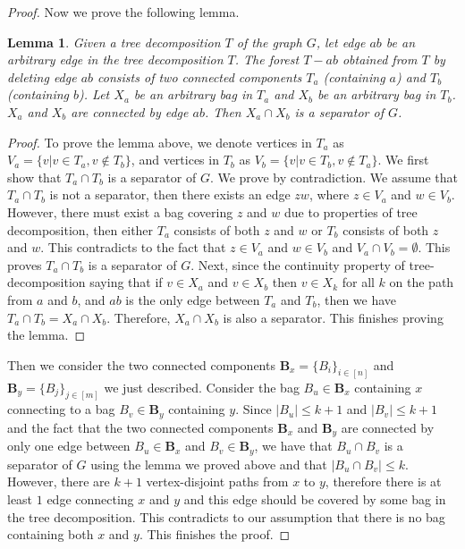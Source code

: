 \documentclass{article}
\newtheorem*{lemma}{Lemma}
\begin{document}
\begin{proof}
Now we prove the following lemma.

\begin{lemma}
Given a tree decomposition \(T\) of the graph \(G\), let edge \(ab\) be an arbitrary edge in the tree decomposition \(T\). The forest \(T-ab\) obtained from \(T\) by deleting edge \(ab\) consists of two connected components \(T_a\) (containing \(a\)) and \(T_b\) (containing \(b\)). Let \(X_a\) be an arbitrary bag in \(T_a\) and \(X_b\) be an arbitrary bag in \(T_b\). \(X_a\) and \(X_b\) are connected by edge \(ab\). Then \(X_a \cap X_b\) is a separator of \(G\).
\end{lemma}

\begin{proof}
To prove the lemma above, we denote vertices in \(T_a\) as \(V_a = \{v|v\in T_a, v \notin T_b\}\), and vertices in \(T_b\) as \(V_b=\{v | v\in T_b, v \notin T_a\}\). We first show that \(T_a \cap T_b\) is a separator of \(G\). We prove by contradiction. We assume that \(T_a \cap T_b\) is not a separator, then there exists an edge \(zw\), where \(z \in V_a\) and \(w \in V_b\). However, there must exist a bag covering \(z\) and \(w\) due to properties of tree decomposition, then either \(T_a\) consists of both \(z\) and \(w\) or \(T_b\) consists of both \(z\) and \(w\). This contradicts to the fact that \(z \in V_a\) and \(w \in V_b\) and \(V_a \cap V_b = \emptyset\). This proves \(T_a \cap T_b\) is a separator of \(G\). Next, since the continuity property of tree-decomposition saying that if \(v \in X_a\) and \(v \in X_b\) then \(v \in X_k\) for all \(k\) on the path from \(a\) and \(b\), and \(ab\) is the only edge between \(T_a\) and \(T_b\), then we have \(T_a \cap T_b = X_a \cap X_b\). Therefore, \(X_a \cap X_b\) is also a separator. This finishes proving the lemma.
\end{proof}

Then we consider the two connected components \(\textbf{B}_x=\{B_i\}_{i \in [n]}\) and \(\textbf{B}_y=\{B_j\}_{j \in [m]}\) we just described. Consider the bag \(B_u \in \textbf{B}_x\) containing \(x\) connecting to a bag \(B_v \in \textbf{B}_y\) containing \(y\). Since \(|B_u| \leq k+1\) and \(|B_v| \leq k+1\) and the fact that the two connected components \(\textbf{B}_x\) and \(\textbf{B}_y\) are connected by only one edge between \(B_u \in \textbf{B}_x\) and \(B_v \in \textbf{B}_y\), we have that \(B_u \cap B_v\) is a separator of \(G\) using the lemma we proved above and that \(|B_u \cap B_v| \leq k\). However, there are \(k+1\) vertex-disjoint paths from \(x\) to \(y\), therefore there is at least \(1\) edge connecting \(x\) and \(y\) and this edge should be covered by some bag in the tree decomposition. This contradicts to our assumption that there is no bag containing both \(x\) and \(y\). This finishes the proof.
\end{proof}
 
\end{document}
